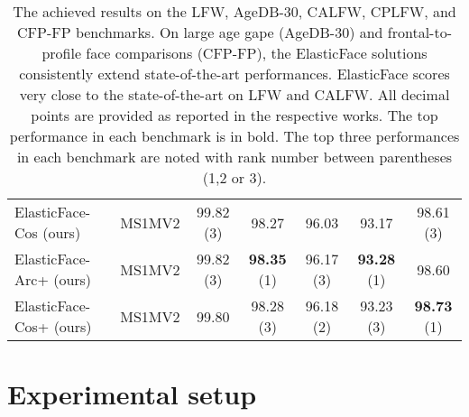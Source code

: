 \documentclass[letterpaper, 10 pt, conference]{ieeeconf}  \usepackage{times}
\begin{document}
\begin{table*}[ht!]
{\begin{tabular}{|l|c|c|c|c|c|c|}
ElasticFace-Cos (ours)  & MS1MV2   \cite{DBLP:conf/eccv/GuoZHHG16,deng2019arcface}                                                                    & 99.82   (3)       & 98.27      & 96.03         & 93.17 & 98.61  (3)      \\  ElasticFace-Arc+ (ours)    & MS1MV2 \cite{DBLP:conf/eccv/GuoZHHG16,deng2019arcface}                                                                      & 99.82   (3)       & \textbf{98.35} (1) & 96.17 (3)         & \textbf{93.28} (1)       & 98.60 \\
ElasticFace-Cos+ (ours)  & MS1MV2   \cite{DBLP:conf/eccv/GuoZHHG16,deng2019arcface}                                                                    & 99.80          & 98.28   (3)       & 96.18 (2)        & 93.23 (3) &\textbf{98.73}  (1)        \\ \hline
\end{tabular}
}
\vspace{2mm}
\caption{The achieved results on the LFW, AgeDB-30, CALFW, CPLFW, and CFP-FP benchmarks. On large age gape (AgeDB-30) and frontal-to-profile face comparisons (CFP-FP), the ElasticFace solutions consistently extend state-of-the-art performances. ElasticFace scores very close to the state-of-the-art on LFW and CALFW. All decimal points are provided as reported in the respective works. The top performance in each benchmark is in bold. The top three performances in each benchmark are noted with rank number between parentheses (1,2 or 3).  }
\label{tab:res_lfw}
\end{table*}



\section{Experimental setup}
\label{sec:exp}
\end{document}
